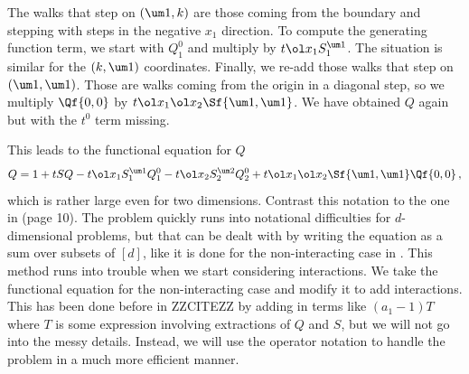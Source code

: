 The walks that step on $(\um 1,k)$ are those coming from the boundary and stepping with steps in the negative $x_1$ direction. To compute the generating function term, we start with $Q_1^0$ and multiply by $t\ol x_1S_1^{\um 1}$. The situation is similar for the $(k,\um 1)$ coordinates. Finally, we re-add those walks that step on $(\um 1,\um 1)$. Those are walks coming from the origin in a diagonal step, so we multiply $\Qf{0,0}$ by $t\ol x_1\ol x_2\Sf{\um 1,\um 1}$. We have obtained $Q$ again but with the $t^0$ term missing.

This leads to the functional equation for $Q$
\begin{align}
	Q = 1 + tSQ - t\ol x_1S_1^{\um 1}Q_1^0 - t\ol x_2S_2^{\um 2}Q_2^0 + t\ol x_1\ol x_2\Sf{\um 1,\um 1}\Qf{0,0}\,,
\end{align}
which is rather large even for two dimensions. Contrast this notation to the one in \cite{bousquet2010walks} (page 10). The problem quickly runs into notational difficulties for $d$-dimensional problems, but that can be dealt with by writing the equation as a sum over subsets of $[d]$, like it is done for the non-interacting case in \cite{melczer2014variants}. This method runs into trouble when we start considering interactions. We take the functional equation for the non-interacting case and modify it to add interactions. This has been done before in ZZCITEZZ by adding in terms like $(a_1-1)T$ where $T$ is some expression involving extractions of $Q$ and $S$, but we will not go into the messy details. Instead, we will use the operator notation to handle the problem in a much more efficient manner.
